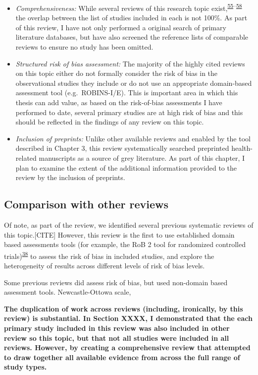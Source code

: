\documentclass[a4paper, twoside]{templates/ociamthesis}
\providecommand{\tightlist}{%
  \setlength{\itemsep}{0pt}\setlength{\parskip}{0pt}}
\begin{document}
\begin{itemize}
\tightlist
\item
  \emph{Comprehensiveness:} While several reviews of this research topic exist,\textsuperscript{\protect\hyperlink{ref-chu2018b}{55}--\protect\hyperlink{ref-poly2020b}{58}} the overlap between the list of studies included in each is not 100\%. As part of this review, I have not only performed a original search of primary literature databases, but have also screened the reference lists of comparable reviews to ensure no study has been omitted.
\item
  \emph{Structured risk of bias assessment:} The majority of the highly cited reviews on this topic either do not formally consider the risk of bias in the observational studies they include or do not use an appropriate domain-based assessment tool (e.g.~ROBINS-I/E). This is important area in which this thesis can add value, as based on the risk-of-bias assessments I have performed to date, several primary studies are at high risk of bias and this should be reflected in the findings of any review on this topic.
\item
  \emph{Inclusion of preprints:} Unlike other available reviews and enabled by the tool described in Chapter 3, this review systematically searched preprinted health-related manuscripts as a source of grey literature. As part of this chapter, I plan to examine the extent of the additional information provided to the review by the inclusion of preprints.
\end{itemize}

\hypertarget{comparison-with-other-reviews}{%
\subsection{Comparison with other reviews}\label{comparison-with-other-reviews}}

Of note, as part of the review, we identified several previous systematic reviews of this topic.{[}CITE{]} However, this review is the first to use established domain based assessments tools (for example, the RoB 2 tool for randomized controlled trials)\textsuperscript{\protect\hyperlink{ref-sterne2019}{38}} to assess the risk of bias in included studies, and explore the heterogeneity of results across different levels of risk of bias levels.

Some previous reviews did assess risk of bias, but used non-domain based assessment tools. Newcastle-Ottowa scale,

\textbf{The duplication of work across reviews (including, ironically, by this review) is substantial. In Section XXXX, I demonstrated that the each primary study included in this review was also included in other review so this topic, but that not all studies were included in all reviews. However, by creating a comprehensive review that attempted to draw together all available evidence from across the full range of study types.}
\end{document}
